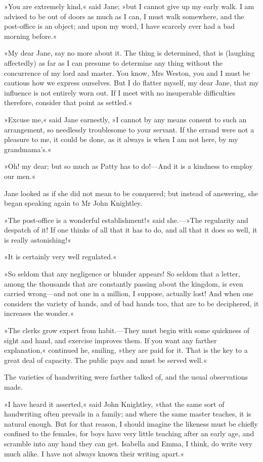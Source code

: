 »You are extremely kind,« said Jane; »but I cannot give up my early walk. I am advised to be out of doors as much as I can, I must walk somewhere, and the post-office is an object; and upon my word, I have scarcely ever had a bad morning before.«

»My dear Jane, say no more about it. The thing is determined, that is (laughing affectedly) as far as I can presume to determine any thing without the concurrence of my lord and master. You know, Mrs Weston, you and I must be cautious how we express ourselves. But I do flatter myself, my dear Jane, that my influence is not entirely worn out. If I meet with no insuperable difficulties therefore, consider that point as settled.«

»Excuse me,« said Jane earnestly, »I cannot by any means consent to such an arrangement, so needlessly troublesome to your servant. If the errand were not a pleasure to me, it could be done, as it always is when I am not here, by my grandmama's.«

»Oh! my dear; but so much as Patty has to do!—And it is a kindness to employ our men.«

Jane looked as if she did not mean to be conquered; but instead of answering, she began speaking again to Mr John Knightley.

»The post-office is a wonderful establishment!« said she.—»The regularity and despatch of it! If one thinks of all that it has to do, and all that it does so well, it is really astonishing!«

»It is certainly very well regulated.«

»So seldom that any negligence or blunder appears! So seldom that a letter, among the thousands that are constantly passing about the kingdom, is even carried wrong—and not one in a million, I suppose, actually lost! And when one considers the variety of hands, and of bad hands too, that are to be deciphered, it increases the wonder.«

»The clerks grow expert from habit.—They must begin with some quickness of sight and hand, and exercise improves them. If you want any farther explanation,« continued he, smiling, »they are paid for it. That is the key to a great deal of capacity. The public pays and must be served well.«

The varieties of handwriting were farther talked of, and the usual observations made.

»I have heard it asserted,« said John Knightley, »that the same sort of handwriting often prevails in a family; and where the same master teaches, it is natural enough. But for that reason, I should imagine the likeness must be chiefly confined to the females, for boys have very little teaching after an early age, and scramble into any hand they can get. Isabella and Emma, I think, do write very much alike. I have not always known their writing apart.«

